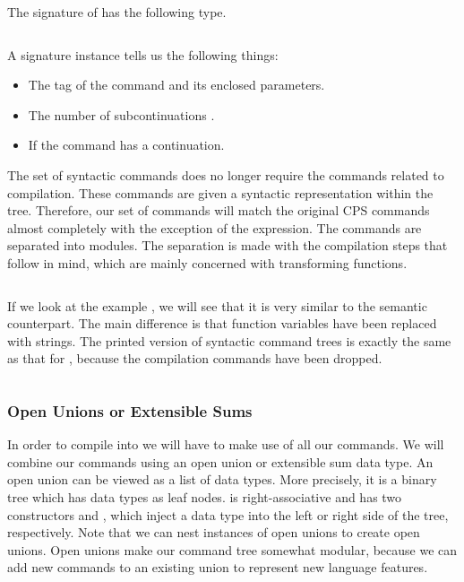 The signature of  has the following type.

\begin{lstlisting}[language=Haskell]
\end{lstlisting}

A signature instance  tells us the following things:

\begin{itemize}
\item The tag of the command and its enclosed parameters.
\item The number of subcontinuations .
\item If the command has a continuation.
\end{itemize}

The set of syntactic commands does no longer require the commands related to compilation. These commands are given a syntactic representation within the tree. Therefore, our set of commands will match the original CPS commands almost completely with the exception of the  expression. The commands are separated into modules. The separation is made with the compilation steps that follow in mind, which are mainly concerned with transforming functions.

\begin{lstlisting}[language=Haskell]
\end{lstlisting}

If we look at the example , we will see that it is very similar to the semantic counterpart. The main difference is that function variables have been replaced with strings. The printed version of syntactic command trees is exactly the same as that for , because the compilation commands have been dropped.

\begin{lstlisting}[language=Haskell]
\end{lstlisting}

\subsubsection{\label{subsection:openunion}Open Unions or Extensible Sums}
In order to compile  into  we will have to make use of all our  commands. We will combine our commands using an open union or extensible sum data type. An open union can be viewed as a list of data types. More precisely, it is a binary tree which has data types as leaf nodes. \icode{:+:} is right-associative and has two constructors  and , which inject a data type into the left or right side of the tree, respectively. Note that we can nest instances of open unions to create open unions. Open unions make our command tree somewhat modular, because we can add new commands to an existing union to represent new language features.

